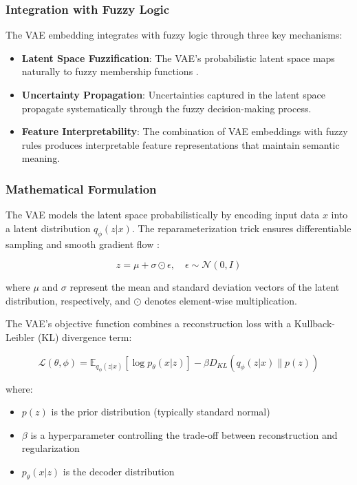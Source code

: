 \documentclass[9pt,a4paper,twoside]{rho-class/rho}
\begin{document}
\subsubsection{Integration with Fuzzy Logic}

The VAE embedding integrates with fuzzy logic through three key mechanisms:

\begin{itemize}
\item \textbf{Latent Space Fuzzification}: The VAE's probabilistic latent space maps naturally to fuzzy membership functions \cite{zadeh}.
\item \textbf{Uncertainty Propagation}: Uncertainties captured in the latent space propagate systematically through the fuzzy decision-making process.
\item \textbf{Feature Interpretability}: The combination of VAE embeddings with fuzzy rules produces interpretable feature representations that maintain semantic meaning.
\end{itemize}

\subsubsection{Mathematical Formulation}

The VAE models the latent space probabilistically by encoding input data $x$ into a latent distribution $q_\phi(z|x)$. The reparameterization trick ensures differentiable sampling and smooth gradient flow \cite{kingma}:

\begin{equation}
z = \mu + \sigma \odot \epsilon, \quad \epsilon \sim \mathcal{N}(0, I)
\end{equation}

where $\mu$ and $\sigma$ represent the mean and standard deviation vectors of the latent distribution, respectively, and $\odot$ denotes element-wise multiplication.

The VAE's objective function combines a reconstruction loss with a Kullback-Leibler (KL) divergence term:

\begin{equation}
\mathcal{L}(\theta, \phi) = \mathbb{E}_{q_\phi(z|x)} \left[ \log p_\theta(x|z) \right] - \beta D_{KL} \left( q_\phi(z|x) \| p(z) \right)
\end{equation}

where:
\begin{itemize}
\item $p(z)$ is the prior distribution (typically standard normal)
\item $\beta$ is a hyperparameter controlling the trade-off between reconstruction and regularization
\item $p_\theta(x|z)$ is the decoder distribution
\end{itemize}
\end{document}
